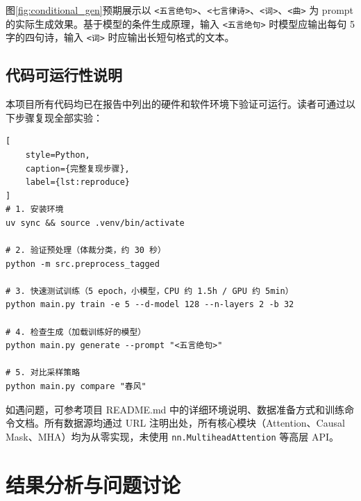 \documentclass[a4paper, 12pt, centering, AutoFakeBold]{article}
\begin{document}
图\ref{fig:conditional_gen}预期展示以 \texttt{<五言绝句>}、\texttt{<七言律诗>}、\texttt{<词>}、\texttt{<曲>} 为 prompt 的实际生成效果。基于模型的条件生成原理，输入 \texttt{<五言绝句>} 时模型应输出每句 5 字的四句诗，输入 \texttt{<词>} 时应输出长短句格式的文本。




\subsection{代码可运行性说明}

本项目所有代码均已在报告中列出的硬件和软件环境下验证可运行。读者可通过以下步骤复现全部实验：

\begin{lstlisting}[
    style=Python,
    caption={完整复现步骤},
    label={lst:reproduce}
]
# 1. 安装环境
uv sync && source .venv/bin/activate

# 2. 验证预处理（体裁分类，约 30 秒）
python -m src.preprocess_tagged

# 3. 快速测试训练（5 epoch，小模型，CPU 约 1.5h / GPU 约 5min）
python main.py train -e 5 --d-model 128 --n-layers 2 -b 32

# 4. 检查生成（加载训练好的模型）
python main.py generate --prompt "<五言绝句>"

# 5. 对比采样策略
python main.py compare "春风"
\end{lstlisting}

如遇问题，可参考项目 README.md 中的详细环境说明、数据准备方式和训练命令文档。所有数据源均通过 URL 注明出处，所有核心模块（Attention、Causal Mask、MHA）均为从零实现，未使用 \texttt{nn.MultiheadAttention} 等高层 API。

\section{结果分析与问题讨论}
\end{document}
